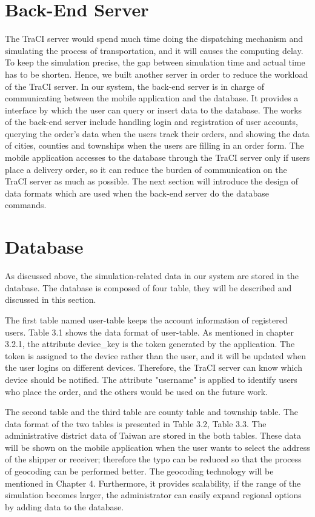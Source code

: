 \documentclass[12pt]{ksthesis}
\begin{document}
\begin{thesis}
{\section{Back-End Server}
The TraCI server would spend much time doing the dispatching mechanism and simulating the process of transportation, and it will causes the computing delay. To keep the simulation precise, the gap between simulation time and actual time has to be shorten. Hence, we built another server in order to reduce the workload of the TraCI server. In our system, the back-end server is in charge of communicating between the mobile application and the database. It provides a interface by which the user can query or insert data to the database. The works of the back-end server include handling login and registration of user accounts, querying the order's data when the users track their orders, and showing the data of cities, counties and townships when the users are filling in an order form. The mobile application accesses to the database through the TraCI server only if users place a delivery order, so it can reduce the burden of communication on the TraCI server as much as possible. The next section will introduce the design of data formats which are used when the back-end server do the database commands.



\section{Database}
As discussed above, the simulation-related data in our system are stored in the database. The database is composed of four table, they will be described and discussed in this section. 

The first table named user-table keeps the account information of registered users. 
Table 3.1 shows the data format of user-table. As mentioned in chapter 3.2.1, the attribute device\_key is the token generated by the application. The token is assigned to the device rather than the user, and it will be updated when the user logins on different devices. Therefore, the TraCI server can know which device should be notified. The attribute "username" is applied to identify users who place the order, and the others would be used on the future work. 

The second table and the third table are county table and township table. The data format of the two tables is presented in Table 3.2, Table 3.3. The administrative district data of Taiwan are stored in the both tables. These data will be shown on the mobile application when the user wants to select the address of the shipper or receiver; therefore the typo can be reduced so that the process of geocoding can be performed better. The geocoding technology will be mentioned in Chapter 4. Furthermore, it provides scalability, if the range of the simulation becomes larger, the administrator can easily expand regional options by adding data to the database. 

}
\end{thesis}
\end{document}
